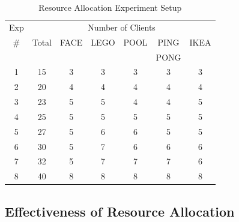 \begin{table}[]
  \centering
  \begin{tabular}{|c|c||c|c|c|c|c|}
    \hline
    Exp & \multicolumn{6}{|c|}{Number of Clients}                                    \\
    \cline{2-7}
    \#  & Total                                   & FACE & LEGO & POOL & PING & IKEA \\
        &                                         &      &      &      & PONG &      \\ \hline
    1   & 15                                      & 3    & 3    & 3    & 3    & 3    \\ \hline
    2   & 20                                      & 4    & 4    & 4    & 4    & 4    \\ \hline
    3   & 23                                      & 5    & 5    & 4    & 4    & 5    \\ \hline
    4   & 25                                      & 5    & 5    & 5    & 5    & 5    \\ \hline
    5   & 27                                      & 5    & 6    & 6    & 5    & 5    \\ \hline
    6   & 30                                      & 5    & 7    & 6    & 6    & 6    \\ \hline
    7   & 32                                      & 5    & 7    & 7    & 7    & 6    \\ \hline
    8   & 40                                      & 8    & 8    & 8    & 8    & 8    \\ \hline
  \end{tabular}
  \vspace{0.1in}
  \caption{Resource Allocation Experiment Setup}
  \label{tab:alloc-exps}
\end{table}

\subsection{Effectiveness of Resource Allocation}

